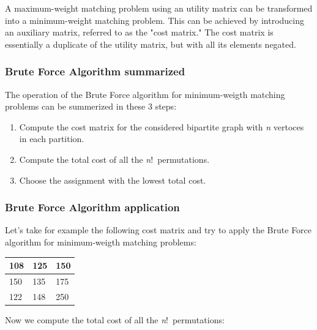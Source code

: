 A maximum-weight matching problem using an utility matrix can be transformed into a minimum-weight matching problem.
This can be achieved by introducing an auxiliary matrix, referred to as the "cost matrix."
The cost matrix is essentially a duplicate of the utility matrix, but with all its elements negated.

\subsubsection{Brute Force Algorithm summarized}
The operation of the Brute Force algorithm for minimum-weigth matching problems can be summerized in these 3 steps:

\begin{enumerate}
    \item {Compute the cost matrix for the considered bipartite graph with \textit{n} vertoces in each partition.}
    \item {Compute the total cost of all the \textit{n}!\ permutations.}
    \item {Choose the assignment with the lowest total cost.}
\end{enumerate}


\subsubsection{Brute Force Algorithm application}

Let's take for example the following cost matrix and try to apply the Brute Force algorithm for minimum-weigth matching problems:

\begin{table}[H]
    \centering
    \begin{tabular}{|m{0.5cm}|m{0.5cm}|m{0.5cm}|}
      \hline
      108 & 125 & 150 \\
      \hline
      150 & 135 & 175 \\
      \hline
      122 & 148 & 250 \\
      \hline
    \end{tabular}
    \end{table}

Now we compute the total cost of all the \textit{n}!\ permutations: 

